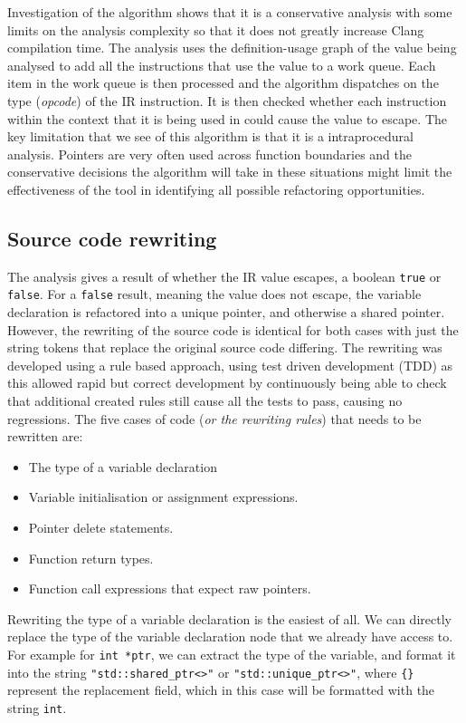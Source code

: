 \documentclass{mpaper}
\begin{document}
    Investigation of the algorithm shows that it is a conservative analysis with some limits on the analysis complexity so that it does not greatly increase Clang compilation time.
    The analysis uses the definition-usage graph of the value being analysed to add all the instructions that use the value to a work queue.
    Each item in the work queue is then processed and the algorithm dispatches on the type (\emph{opcode}) of the IR instruction.
    It is then checked whether each instruction within the context that it is being used in could cause the value to escape.
    The key limitation that we see of this algorithm is that it is a intraprocedural analysis.
    Pointers are very often used across function boundaries and the conservative decisions the algorithm will take in these situations might limit the effectiveness of the tool in identifying all possible refactoring opportunities. 

    \subsection{Source code rewriting}
    
    The analysis gives a result of whether the IR value escapes, a boolean \texttt{true} or \texttt{false}.
    For a \texttt{false} result, meaning the value does not escape, the variable declaration is refactored into a unique pointer, and otherwise a shared pointer.
    However, the rewriting of the source code is identical for both cases with just the string tokens that replace the original source code differing.
    The rewriting was developed using a rule based approach, using test driven development (TDD) as this allowed rapid but correct development by continuously being able to check that additional created rules still cause all the tests to pass, causing no regressions. 
    The five cases of code (\emph{or the rewriting rules}) that needs to be rewritten are:
    \begin{itemize}
        \item The type of a variable declaration
        \item Variable initialisation or assignment expressions.
        \item Pointer delete statements.
        \item Function return types.
        \item Function call expressions that expect raw pointers.
    \end{itemize}
    
    Rewriting the type of a variable declaration is the easiest of all. We can directly replace the type of the variable declaration node that we already have access to. 
    For example for \texttt{int *ptr}, we can extract the type of the variable, and format it into the string \texttt{"std::shared_ptr<{}>"} or \texttt{"std::unique_ptr<{}>"}, where \texttt{\{\}} represent the replacement field, which in this case will be formatted with the string \texttt{int}.
    
\end{document}
